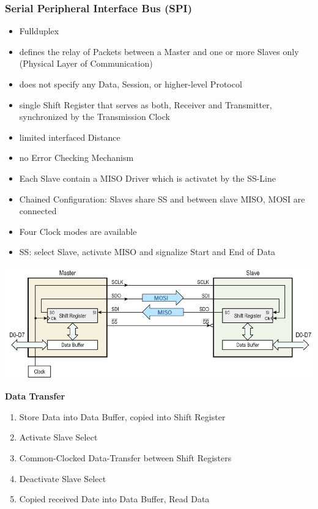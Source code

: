 \subsubsection{Serial Peripheral Interface Bus (\acs{SPI})} 
\begin{multicols}{2}
    \begin{itemize}
    	\item Fullduplex
    	\item defines the relay of Packets between a Master and one or more Slaves only (Physical Layer of Communication)
    	\item does not specify any Data, Session, or higher-level Protocol
    	\item single Shift Register that serves as both, Receiver and Transmitter, synchronized by the Transmission Clock
    	\item limited interfaced Distance
    	\item no Error Checking Mechanism
    	\item Each Slave contain a \acs{MISO} Driver which is activatet by the \acs{SS}-Line
    	\item Chained Configuration: Slaves share \acs{SS} and between slave \acs{MISO}, \acs{MOSI} are connected
    	\item Four Clock modes are available
    	\item \acs{SS}: select Slave, activate \acs{MISO} and signalize Start and End of Data
    \end{itemize}
\end{multicols}
\begin{minipage}{0.6\linewidth}
    \includegraphics[width=\linewidth]{images/spi.png}
\end{minipage}
\begin{minipage}{0.4\linewidth}
     \textbf{Data Transfer}
    \begin{enumerate}
    	\item Store Data into Data Buffer, copied into Shift Register
    	\item Activate Slave Select
    	\item Common-Clocked Data-Transfer between Shift Registers
    	\item Deactivate Slave Select
    	\item Copied received Date into Data Buffer, Read Data
    \end{enumerate}
\end{minipage}
\clearpage
\vspace{-1cm}
